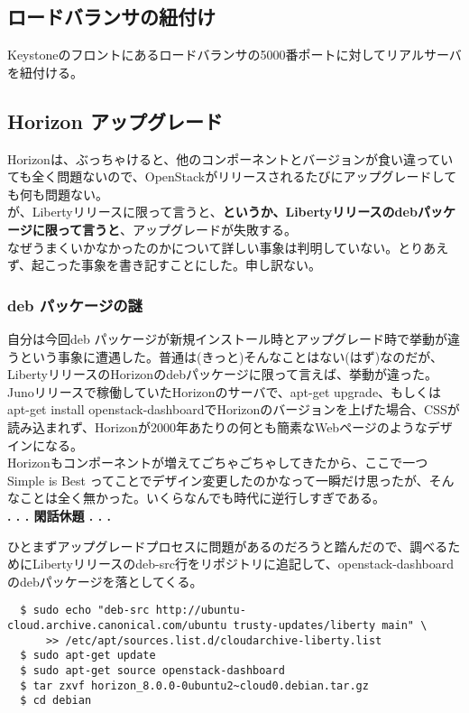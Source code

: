 \documentclass[9pt,b5paper,tombo,openany]{jsbook}
\begin{document}
\subsection{ロードバランサの紐付け}
Keystoneのフロントにあるロードバランサの5000番ポートに対してリアルサーバを紐付ける。

\subsection{Horizon アップグレード}
Horizonは、ぶっちゃけると、他のコンポーネントとバージョンが食い違っていても全く問題ないので、OpenStackがリリースされるたびにアップグレードしても何も問題ない。\\[1ex]

が、Libertyリリースに限って言うと、\textbf{というか、Libertyリリースのdebパッケージに限って言うと}、アップグレードが失敗する。\\[1ex]

なぜうまくいかなかったのかについて詳しい事象は判明していない。とりあえず、起こった事象を書き記すことにした。申し訳ない。

\subsubsection{deb パッケージの謎}
自分は今回deb パッケージが新規インストール時とアップグレード時で挙動が違うという事象に遭遇した。普通は(きっと)そんなことはない(はず)なのだが、LibertyリリースのHorizonのdebパッケージに限って言えば、挙動が違った。\\[1ex]

Junoリリースで稼働していたHorizonのサーバで、apt-get upgrade、もしくはapt-get install openstack-dashboardでHorizonのバージョンを上げた場合、CSSが読み込まれず、Horizonが2000年あたりの何とも簡素なWebページのようなデザインになる。\\[1ex]

Horizonもコンポーネントが増えてごちゃごちゃしてきたから、ここで一つ Simple is Best ってことでデザイン変更したのかなって一瞬だけ思ったが、そんなことは全く無かった。いくらなんでも時代に逆行しすぎである。\\[1ex]

\noindent
\textbf{. . . 閑話休題 . . .}

ひとまずアップグレードプロセスに問題があるのだろうと踏んだので、調べるためにLibertyリリースのdeb-src行をリポジトリに追記して、openstack-dashboardのdebパッケージを落としてくる。

\begin{lstlisting}
  $ sudo echo "deb-src http://ubuntu-cloud.archive.canonical.com/ubuntu trusty-updates/liberty main" \
      >> /etc/apt/sources.list.d/cloudarchive-liberty.list
  $ sudo apt-get update
  $ sudo apt-get source openstack-dashboard
  $ tar zxvf horizon_8.0.0-0ubuntu2~cloud0.debian.tar.gz
  $ cd debian
\end{lstlisting}
\end{document}
